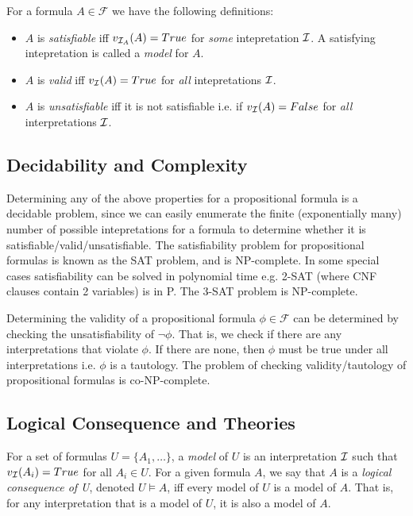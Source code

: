\documentclass[10pt]{article}
\begin{document}
For a formula $A \in \mathcal{F}$ we have the following definitions:
\begin{itemize}
    \item $A$ is \textit{satisfiable} iff $v_{\mathcal{I}_{A}}(A) = True$ for \textit{some} intepretation $\mathcal{I}$. A satisfying intepretation is called a \textit{model} for $A$.
    \item $A$ is \textit{valid} iff $v_{\mathcal{I}}(A)=True$ for \textit{all} intepretations $\mathcal{I}$.
    \item $A$ is \textit{unsatisfiable} iff it is not satisfiable i.e. if $v_{\mathcal{I}}(A)=False$ for \textit{all} interpretations $\mathcal{I}$.
\end{itemize}

\subsection{Decidability and Complexity}

Determining any of the above properties for a propositional formula is a decidable problem, since we can easily enumerate the finite (exponentially many) number of possible intepretations for a formula to determine whether it is satisfiable/valid/unsatisfiable. The satisfiability problem for propositional formulas is known as the SAT problem, and is NP-complete. In some special cases satisfiability can be solved in polynomial time e.g. 2-SAT (where CNF clauses contain 2 variables) is in P. The 3-SAT problem is NP-complete. 

Determining the validity of a propositional formula $\phi \in \mathcal{F}$ can be determined by checking the unsatisfiability of $\neg \phi$. That is, we check if there are any interpretations that violate $\phi$. If there are none, then $\phi$ must be true under all interpretations i.e. $\phi$ is a tautology. The problem of checking validity/tautology of propositional formulas is co-NP-complete.

\subsection{Logical Consequence and Theories}

For a set of formulas $U=\{A_1,\dots\}$, a \textit{model} of $U$ is an interpretation $\mathcal{I}$ such that $v_{\mathcal{I}}(A_i)=True$ for all $A_i \in U$. For a given formula $A$, we say that $A$ is a \textit{logical consequence of U}, denoted $U \vDash A$, iff every model of $U$ is a model of $A$. That is, for any interpretation that is a model of $U$, it is also a model of $A$.
\end{document}
